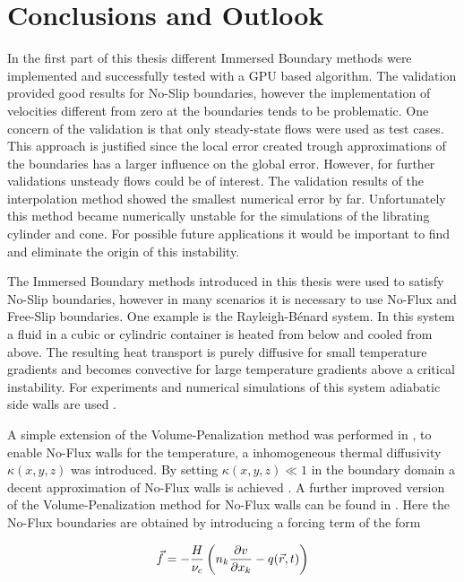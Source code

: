 \chapter*{Conclusions and Outlook}

In the first part of this thesis different Immersed Boundary methods were
implemented and successfully tested with a GPU based algorithm.
The validation provided good results for No-Slip boundaries, however the implementation of velocities different from zero at the boundaries tends to be problematic.
One concern of the validation is that only steady-state flows were used as test cases.
This approach is justified since the local error created trough approximations of the boundaries
has a larger influence on the global error.
However, for further validations unsteady flows could be of interest.
The validation results of the interpolation method showed the smallest numerical error by far.
Unfortunately this method became numerically unstable for the simulations of the librating cylinder and cone.
For possible future applications it would be important to find and eliminate the origin of this instability.

The Immersed Boundary methods introduced in this thesis were used to satisfy No-Slip boundaries, however
in many scenarios it is necessary to use No-Flux and Free-Slip boundaries.
One example is the Rayleigh-B\'{e}nard system.
In this system a fluid in a cubic or cylindric container is heated from below and cooled from above.
The resulting heat transport is purely diffusive for small temperature gradients and
becomes convective for large temperature gradients above a critical instability.
For experiments and numerical simulations of this system adiabatic side walls are used \citep{Lulff2011}.

A simple extension of the Volume-Penalization method was performed in \citep{Lulff2011},
to enable No-Flux walls for the temperature, a inhomogeneous thermal diffusivity $\kappa (x, y, z)$ was introduced.
By setting $\kappa(x, y, z) \ll 1$ in the boundary domain  a decent approximation of No-Flux walls  is achieved \citep{Lulff2011}.
A further improved version of the Volume-Penalization method for No-Flux walls can be found in \citep{Brown-Dymkoski2014}.
Here the No-Flux boundaries are obtained by introducing a forcing term of the form

\begin{align}
    \vec{f}  = -\frac{H}{\nu_c}\left( n_k\pdn[v]{x_k} - q(\vec{r}, t) \right)
\end{align}

